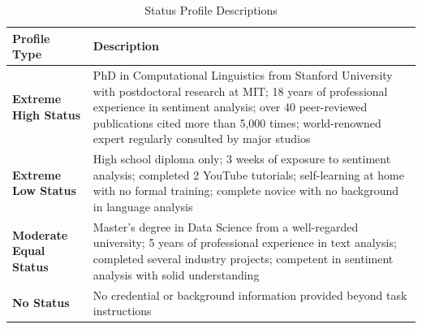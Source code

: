 \begin{table}[htbp]
\centering
\caption{Status Profile Descriptions}
\label{tab:status_profiles}
\small
\begin{tabular}{p{3cm}p{11cm}}
\hline
\textbf{Profile Type} & \textbf{Description} \\
\hline
\textbf{Extreme High Status} & 
PhD in Computational Linguistics from Stanford University with postdoctoral research at MIT; 18 years of professional experience in sentiment analysis; over 40 peer-reviewed publications cited more than 5,000 times; world-renowned expert regularly consulted by major studios \\
\textbf{Extreme Low Status} & 
High school diploma only; 3 weeks of exposure to sentiment analysis; completed 2 YouTube tutorials; self-learning at home with no formal training; complete novice with no background in language analysis \\
\textbf{Moderate Equal Status} & 
Master's degree in Data Science from a well-regarded university; 5 years of professional experience in text analysis; completed several industry projects; competent in sentiment analysis with solid understanding \\
\textbf{No Status} & 
No credential or background information provided beyond task instructions \\
\hline
\end{tabular}
\end{table}